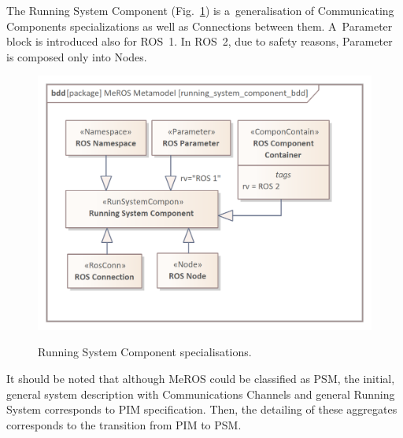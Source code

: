 \documentclass[11pt,oneside,a4paper]{report}
\begin{document}
	The Running System Component (Fig.~\ref{fig:running_system_component_bdd}) is a~generalisation of Communicating Components specializations as well as Connections between them. A~Parameter block is introduced also for ROS~1. In ROS~2, due to safety reasons, Parameter is composed only into Nodes.
	

	\begin{figure}[H]
		\centering
		\begin{center}
			{\includegraphics[scale=1.0]{img/meros_pkg/running_system_component_bdd.png}}
		\end{center}
		\caption{Running System Component specialisations.} 
		\label{fig:running_system_component_bdd}
	\end{figure} 
	 	 

	It should be noted that although MeROS could be classified as PSM, the initial, general system description with Communications Channels and general Running System corresponds to PIM specification. Then, the detailing of these aggregates corresponds to the transition from PIM to PSM. 
	
		
%
%
	
\end{document}
